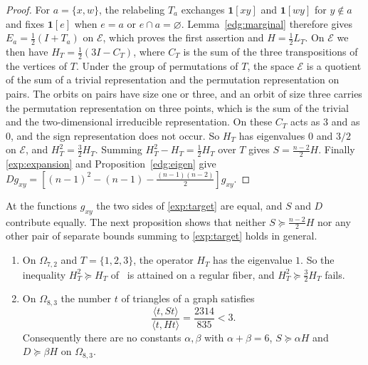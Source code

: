 \begin{proof}
For $a=\{x,w\}$, the relabeling $T_a$ exchanges $\mathbf1[xy]$ and
$\mathbf1[wy]$ for $y\notin a$ and fixes $\mathbf1[e]$ when $e=a$ or
$e\cap a=\varnothing$. Lemma~\ref{edg:marginal} therefore gives
$E_a=\tfrac12(I+T_a)$ on $\mathcal E$, which proves the first assertion and
$H=\tfrac12L_T$. On $\mathcal E$ we then have
$H_T=\tfrac12(3I-C_T)$, where $C_T$ is the sum of the three transpositions of
the vertices of $T$. Under the group of permutations of $T$, the space $\mathcal E$ is a quotient
of the sum of a trivial representation and the permutation representation on
pairs. The orbits on pairs have size one or three, and
an orbit of size three carries the permutation representation on three
points, which is the sum of the trivial and the two-dimensional irreducible
representation. On these $C_T$ acts as $3$ and as $0$, and the sign
representation does not occur. So $H_T$ has eigenvalues $0$ and $3/2$ on
$\mathcal E$, and $H_T^2=\tfrac32H_T$. Summing $H_T^2-H_T=\tfrac12H_T$ over
$T$ gives $S=\tfrac{n-2}2H$. Finally \eqref{exp:expansion} and
Proposition~\ref{edg:eigen} give
$Dg_{xy}=[(n-1)^2-(n-1)-\tfrac{(n-1)(n-2)}2]g_{xy}$.
\end{proof}

At the functions $g_{xy}$ the two sides of \eqref{exp:target} are equal, and
$S$ and $D$ contribute equally. The next proposition shows that neither
$S\succeq\tfrac{n-2}2H$ nor any other pair of separate bounds summing to
\eqref{exp:target} holds in general.

\begin{proposition}\label{exp:obstruction}
\begin{enumerate}
\item On $\Omega_{7,2}$ and $T=\{1,2,3\}$, the operator $H_T$ has the
eigenvalue $1$. So the inequality $H_T^2\succeq H_T$
of~\cite[Lemma~A.4]{S26} is attained on a regular fiber, and
$H_T^2\succeq\tfrac32H_T$ fails.
\item On $\Omega_{8,3}$ the number $t$ of triangles of a graph satisfies
\[
 \frac{\langle t,St\rangle}{\langle t,Ht\rangle}=\frac{2314}{835}<3 .
\]
Consequently there are no constants $\alpha,\beta$ with $\alpha+\beta=6$,
$S\succeq\alpha H$ and $D\succeq\beta H$ on $\Omega_{8,3}$.
\end{enumerate}
\end{proposition}

